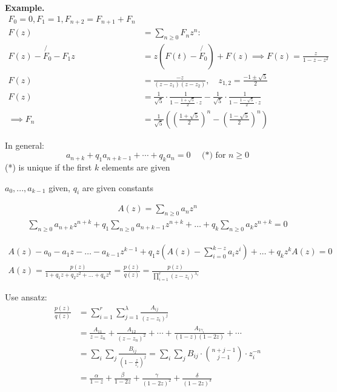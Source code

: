\textbf{Example.}
\begin{align*}
    F_0 = 0, F_1 = 1, F_{n+2} = F_{n+1} + F_n \\
    F(z) &= \sum_{n≥0} F_n z^n : \\
    F(z) - \not{F_0} - F_1 z &= z \left( F(t) - \not{F_0} \right) + F(z)
        \implies F(z) = \frac{z}{1-z-z^2} \\
    F(z) &= \frac{-z}{(z-z_1) (z-z_2)},
        \quad z_{1,2} = \frac{-1 \pm \sqrt{5}}{2} \\
    F(z) &= \frac1{\sqrt{5}} \cdot \frac{1}{1- \frac{1 + \sqrt{5}}{2} \cdot z} - \frac{1}{\sqrt{5}} \cdot \frac{1}{1- \frac{1 - \sqrt{5}}{2} \cdot z}  \\
    \implies F_n &= \frac{1}{\sqrt{5}}
		\left( \left( \frac{1+ \sqrt 5}{2} \right)^n
		- \left( \frac{1-\sqrt{5}}{2} \right)^n
		\right)
\end{align*}


In general:
\[
    a_{n+k} + q_1 a_{n+k-1} + \cdots + q_k a_n = 0
    \quad  \text{ (*) for }n \geq 0
\]
(*) is unique if the first $k$ elements are given

$a_0, ..., a_{k-1}$ given, $q_i$ are given constants

\begin{align*}
A(z) = \sum_{n\geq 0} a_n z^n
\end{align*}
\begin{align*}
\sum_{n\geq 0} a_{n+k} z^{n+k} + q_1 \sum_{n\geq 0}  a_{n+k-1}z^{n+k} + \ldots + q_k \sum_{n\geq 0} a_k z^{n+k} = 0
\end{align*}

\begin{align*}
A(z) - a_0 - a_1 z - \ldots - a_{k-1} z^{k-1} + q_1 z \left( A(z) - \sum_{i=0}^{k-z} a_i z^i \right) + \ldots + q_k z^k A(z) = 0\\
A(z) = \frac{ p(z) }{ 1 + q_1 z + q_2 z^2 + \ldots + q_k z^k } = \frac{p(z)}{q(z)} = \frac{p(z)}{\prod_{i=1}^{r} (z - z_i)^{\lambda_i}}
\end{align*}


Use ansatz:
\begin{align*}
\frac{p(z)}{q(z)} &= \sum_{i=1}^{r} \sum_{j=1}^{\lambda} \frac{A_{ij}}{(z-z_i)^j} \\
&= \frac{A_{11}}{z-z_n} + \frac{A_{12}}{(z-z_n)^2} + \cdots + \frac{A_{1\gamma_i}}{(1-z)(1-2z)} + \cdots \\
&= \sum_i\sum_j \frac{B_{ij}}{\left(1-\frac{z}{z_i}\right)^j}= \sum_i\sum_j B_{ij} \cdot \binom {n+j-1}{j-1} \cdot z_i^{-n}\\
&= \frac{\alpha}{1-z} + \frac{\beta}{1-2z} + \frac{\gamma}{(1-2z)^2} + \frac{\delta}{(1-2z)^3}
\end{align*}

